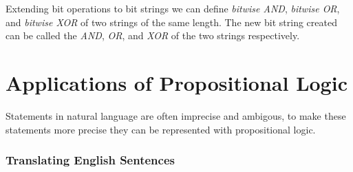 \documentclass[12pt letter]{report}
\begin{document}
Extending bit operations to bit strings we can define \textit{bitwise AND}, \textit{bitwise OR}, and \textit{bitwise XOR} of two strings of the same length. The new bit string created can be called the \textit{AND}, \textit{OR}, and
\textit{XOR} of the two strings respectively.



\chapter{Applications of Propositional Logic}

Statements in natural language are often imprecise and ambigous, to make these statements more precise they can be
represented with propositional logic.

\subsection{Translating English Sentences}
\end{document}
